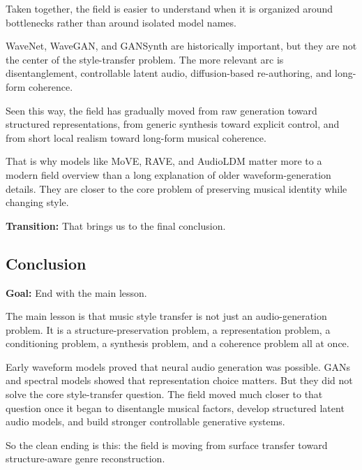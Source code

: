 \documentclass[11pt]{article}
\begin{document}
Taken together, the field is easier to understand when it is organized around bottlenecks rather than around isolated model names.

WaveNet, WaveGAN, and GANSynth are historically important, but they are not the center of the style-transfer problem. The more relevant arc is disentanglement, controllable latent audio, diffusion-based re-authoring, and long-form coherence.

Seen this way, the field has gradually moved from raw generation toward structured representations, from generic synthesis toward explicit control, and from short local realism toward long-form musical coherence.

That is why models like MoVE, RAVE, and AudioLDM matter more to a modern field overview than a long explanation of older waveform-generation details. They are closer to the core problem of preserving musical identity while changing style.

\textbf{Transition:} That brings us to the final conclusion.

\subsection*{Conclusion}
\textbf{Goal:} End with the main lesson.

The main lesson is that music style transfer is not just an audio-generation problem. It is a structure-preservation problem, a representation problem, a conditioning problem, a synthesis problem, and a coherence problem all at once.

Early waveform models proved that neural audio generation was possible. GANs and spectral models showed that representation choice matters. But they did not solve the core style-transfer question. The field moved much closer to that question once it began to disentangle musical factors, develop structured latent audio models, and build stronger controllable generative systems.

So the clean ending is this: the field is moving from surface transfer toward structure-aware genre reconstruction.
\end{document}
